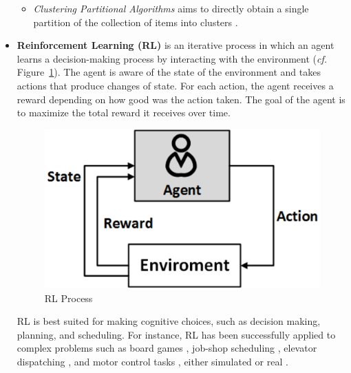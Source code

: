 \begin{itemize}
\begin{itemize}
        \item \textit{Clustering Partitional Algorithms} aims to directly obtain a single partition of the collection of items into clusters \cite{Grira_2004:ml_techniques}.
    \end{itemize}{}
    
    \item \textbf{Reinforcement Learning (RL)} is an iterative process in which an agent learns a decision-making process by interacting with the environment (\textit{cf.} Figure~\ref{fig:rl}). The agent is aware of the state of the environment and takes actions that produce changes of state. For each action, the agent receives a reward depending on how good was the action taken. The goal of the agent is to maximize the total reward it receives over time.
    
    \begin{figure}[!ht]
        \centering
        \includegraphics[scale=0.6]{figures/rl}
        \caption{RL Process}
        \label{fig:rl}
    \end{figure}
    
    RL is best suited for making cognitive choices, such as decision making, planning, and scheduling. For instance, RL has been successfully applied to complex problems such as board games \cite{tesauro_1995:temporal}, job-shop scheduling \cite{yoshimoto_1999:application}, elevator dispatching \cite{crites_1998:elevator}, and motor control tasks \cite{doya_2000:reinforcement}, either simulated or real \cite{schaal_1994:robot}.
    
\end{itemize}